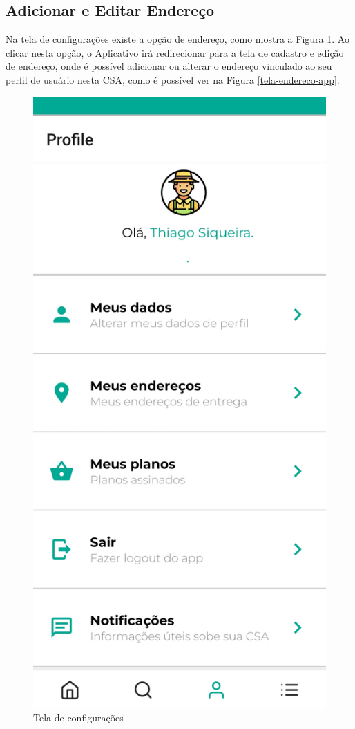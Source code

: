 \subsection{Adicionar e Editar Endereço}
Na tela de configurações existe a opção de endereço, como mostra a Figura \ref{tela-config-app}. Ao clicar nesta opção, o Aplicativo irá redirecionar para a tela de cadastro e edição de endereço, onde é possível adicionar ou alterar o endereço vinculado ao seu perfil de usuário nesta CSA, como é possível ver na Figura \ref{tela-endereco-app}.

\begin{figure}[h]
	\centering
	\includegraphics[keepaspectratio=true,scale=0.16]{figuras/tela_config.jpg}
	\caption{Tela de configurações}
        \label{tela-config-app}
\end{figure}

